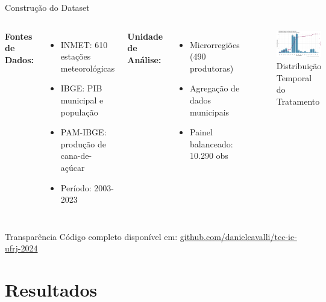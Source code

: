 \documentclass[10pt,aspectratio=169]{beamer}
\begin{document}
\begin{frame}{Construção do Dataset}
\begin{columns}
\textbf{Fontes de Dados:}
\begin{itemize}
    \item INMET: 610 estações meteorológicas
    \item IBGE: PIB municipal e população
    \item PAM-IBGE: produção de cana-de-açúcar
    \item Período: 2003-2023
\end{itemize}

\textbf{Unidade de Análise:}
\begin{itemize}
    \item Microrregiões (490 produtoras)
    \item Agregação de dados municipais
    \item Painel balanceado: 10.290 obs
\end{itemize}

\begin{figure}
\centering
\includegraphics[width=\textwidth]{../../../data/outputs/descriptive_analysis/distribuicao_temporal_tratamento.png}
\caption{Distribuição Temporal do Tratamento}
\end{figure}
\end{columns}

\begin{block}{Transparência}
Código completo disponível em: \url{github.com/danielcavalli/tcc-ie-ufrj-2024}
\end{block}
\end{frame}

\section{Resultados}
\end{document}
